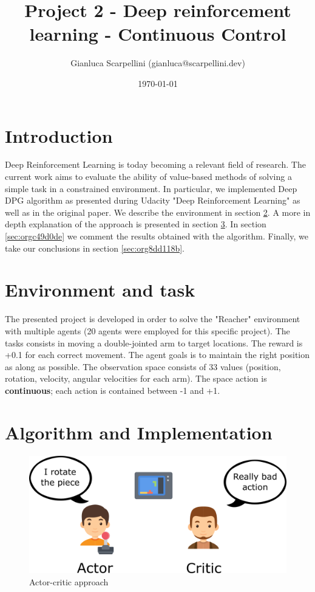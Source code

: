 \documentclass[11pt]{article}
\author{Gianluca Scarpellini (gianluca@scarpellini.dev)}
\date{\today}
\title{Project 2 - Deep reinforcement learning - Continuous Control}
\begin{document}
\maketitle
\tableofcontents


\section{Introduction}
\label{sec:org8397757}
Deep Reinforcement Learning is today becoming a relevant field of research. The
current work aims to evaluate the ability of value-based methods of solving a
simple task in a constrained environment. In particular, we implemented Deep
DPG algorithm as presented during Udacity "Deep Reinforcement Learning"
as well as in the original paper. We describe the environment in section
\ref{sec:org754b3bc}. A more in depth explanation of the approach is presented in
section \ref{sec:org1fc6b2c}. In section \ref{sec:orgc49d0de} we comment the results
obtained with the algorithm. Finally, we take our conclusions in section
\ref{sec:org8dd118b}. 


\section{Environment and task}
\label{sec:org754b3bc}
The presented project is developed in order to solve the "Reacher" environment
with multiple agents (20 agents were employed for this specific project). The
tasks consists in moving a double-jointed arm to target locations. The reward is
+0.1 for each correct movement. The agent goals is to maintain the right
position as along as possible. The observation space consists of 33 values
(position, rotation, velocity, angular velocities for each arm). The space
action is \textbf{continuous}; each action is contained between -1 and +1.

\section{Algorithm and Implementation}
\label{sec:org1fc6b2c}
\begin{figure}[htbp]
\centering
\includegraphics[width=.9\linewidth]{../contents/actor_critic.png}
\caption{\label{fig:org8e45ddd}Actor-critic approach}
\end{figure}
\end{document}
